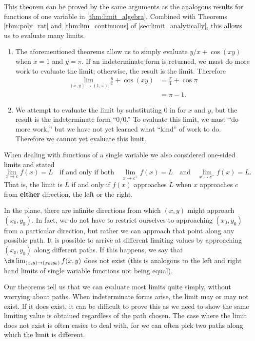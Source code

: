 This theorem can be proved by the same arguments as the analogous results for functions of one variable in \autoref{thm:limit_algebra}.  Combined with Theorems \ref{thm:poly_rat} and \ref{thm:lim_continuous} of \autoref{sec:limit_analytically}, this allows us to evaluate many limits.

{\begin{enumerate}
	\item The aforementioned theorems allow us to simply evaluate $y/x+\cos(xy)$ when $x=1$ and $y=\pi$. If an indeterminate form is returned, we must do more work to evaluate the limit; otherwise, the result is the limit. Therefore
	\begin{align*}
	\lim_{(x,y)\to (1,\pi)} \frac yx + \cos(xy)  &= \frac\pi{1}+\cos \pi \\
		&= \pi -1.
	\end{align*}
	\item		We attempt to evaluate the limit by substituting 0 in for $x$ and $y$, but the result is the indeterminate form ``$0/0$.'' To evaluate this limit, we must ``do more work,'' but we have not yet learned what ``kind'' of work to do. Therefore we cannot yet evaluate this limit.\eoehere
\end{enumerate}}

When dealing with functions of a single variable we also considered one-sided limits and stated
\[
\lim_{x\to c}f(x) = L
\quad\text{if and only if both}\quad
\lim_{x\to c^+}f(x) =L \quad\text{and}\quad \lim_{x\to c^-}f(x) =L.
\]
That is, the limit is $L$ if and only if $f(x)$ approaches $L$ when $x$ approaches $c$ from \textbf{either} direction, the left or the right.

In the plane, there are infinite directions from which $(x,y)$ might approach $(x_0,y_0)$. In fact, we do not have to restrict ourselves to approaching $(x_0,y_0)$ from a particular direction, but rather we can approach that point along any possible path. It is possible to arrive at different limiting values by approaching $(x_0,y_0)$ along different paths. If this happens, we say that $\ds \lim_{(x,y)\to(x_0,y_0) } f(x,y)$ does not exist (this is analogous to the left and right hand limits of single variable functions not being equal).

Our theorems tell us that we can evaluate most limits quite simply, without worrying about  paths. When indeterminate forms arise, the limit may or may not exist. If it does exist, it can be difficult to prove this as we need to show the same limiting value is obtained regardless of the path chosen. The case where the limit does not exist is often easier to deal with, for we can often pick two paths along which the limit is different.

